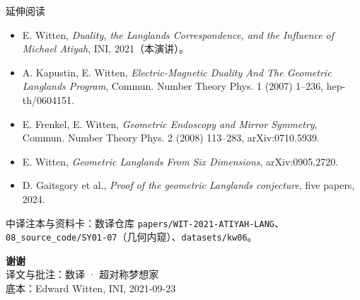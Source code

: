 \begin{frame}{延伸阅读}
  \footnotesize
  \begin{itemize}
    \item E. Witten, \emph{Duality, the Langlands Correspondence, and the Influence of
      Michael Atiyah}, INI, 2021（本演讲）。
    \item A. Kapustin, E. Witten, \emph{Electric-Magnetic Duality And The Geometric
      Langlands Program}, Commun. Number Theory Phys. 1 (2007) 1--236, hep-th/0604151.
    \item E. Frenkel, E. Witten, \emph{Geometric Endoscopy and Mirror Symmetry},
      Commun. Number Theory Phys. 2 (2008) 113--283, arXiv:0710.5939.
    \item E. Witten, \emph{Geometric Langlands From Six Dimensions}, arXiv:0905.2720.
    \item D. Gaitsgory et al., \emph{Proof of the geometric Langlands conjecture},
      five papers, 2024.
    \end{itemize}
  \vspace{0.2em}
  \begin{center}\scriptsize
  中译注本与资料卡：数译仓库 \texttt{papers/WIT-2021-ATIYAH-LANG}、
  \texttt{08\_source\_code/SY01-07}（几何内窥）、\texttt{datasets/kw06}。
  \end{center}
\end{frame}

\begin{frame}{}
  \vspace{2.2cm}
  \begin{center}
  {\Large\bfseries 谢谢}\\[0.8em]
  {\small 译文与批注：数译 · 超对称梦想家}\\[0.3em]
  {\small 底本：Edward Witten, INI, 2021-09-23}
  \end{center}
\end{frame}
